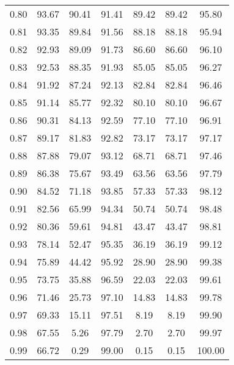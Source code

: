 \begin{tabular}{|c|c|c|c|c|c|c|}
      0.80 &     93.67 &     90.41 &      91.41 &   89.42 &      89.42 &         95.80 \\
      0.81 &     93.35 &     89.84 &      91.56 &   88.18 &      88.18 &         95.94 \\
      0.82 &     92.93 &     89.09 &      91.73 &   86.60 &      86.60 &         96.10 \\
      0.83 &     92.53 &     88.35 &      91.93 &   85.05 &      85.05 &         96.27 \\
      0.84 &     91.92 &     87.24 &      92.13 &   82.84 &      82.84 &         96.46 \\
      0.85 &     91.14 &     85.77 &      92.32 &   80.10 &      80.10 &         96.67 \\
      0.86 &     90.31 &     84.13 &      92.59 &   77.10 &      77.10 &         96.91 \\
      0.87 &     89.17 &     81.83 &      92.82 &   73.17 &      73.17 &         97.17 \\
      0.88 &     87.88 &     79.07 &      93.12 &   68.71 &      68.71 &         97.46 \\
      0.89 &     86.38 &     75.67 &      93.49 &   63.56 &      63.56 &         97.79 \\
      0.90 &     84.52 &     71.18 &      93.85 &   57.33 &      57.33 &         98.12 \\
      0.91 &     82.56 &     65.99 &      94.34 &   50.74 &      50.74 &         98.48 \\
      0.92 &     80.36 &     59.61 &      94.81 &   43.47 &      43.47 &         98.81 \\
      0.93 &     78.14 &     52.47 &      95.35 &   36.19 &      36.19 &         99.12 \\
      0.94 &     75.89 &     44.42 &      95.92 &   28.90 &      28.90 &         99.38 \\
      0.95 &     73.75 &     35.88 &      96.59 &   22.03 &      22.03 &         99.61 \\
      0.96 &     71.46 &     25.73 &      97.10 &   14.83 &      14.83 &         99.78 \\
      0.97 &     69.33 &     15.11 &      97.51 &    8.19 &       8.19 &         99.90 \\
      0.98 &     67.55 &      5.26 &      97.79 &    2.70 &       2.70 &         99.97 \\
      0.99 &     66.72 &      0.29 &      99.00 &    0.15 &       0.15 &        100.00 \\
\bottomrule
\end{tabular}
